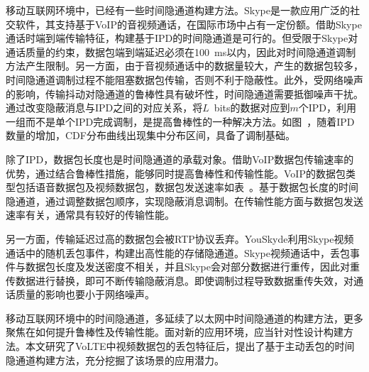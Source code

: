 移动互联网环境中，已经有一些时间隐通道构建方法。Skype是一款应用广泛的社交软件，其支持基于VoIP的音视频通话，在国际市场中占有一定份额。借助Skype通话时端到端传输特征，构建基于IPD的时间隐通道是可行的。但受限于Skype对通话质量的约束，数据包端到端延迟必须在{100\ ms}以内，因此对时间隐通道调制方法产生限制。另一方面，由于音视频通话中的数据量较大，产生的数据包较多，时间隐通道调制过程不能阻塞数据包传输，否则不利于隐蔽性。此外，受网络噪声的影响，传输抖动对隐通道的鲁棒性具有破坏性，时间隐通道需要抵御噪声干扰。通过改变隐蔽消息与IPD之间的对应关系，将{$L$\ bits}的数据对应到$m$个IPD，利用一组而不是单个IPD完成调制，是提高鲁棒性的一种解决方法。如图\ ，随着IPD数量的增加，CDF分布曲线出现集中分布区间，具备了调制基础。


除了IPD，数据包长度也是时间隐通道的承载对象。借助VoIP数据包传输速率的优势，通过结合鲁棒性措施，能够同时提高鲁棒性和传输性能。VoIP的数据包类型包括语音数据包及视频数据包，数据包发送速率如表\ 。基于数据包长度的时间隐通道，通过调整数据包顺序，实现隐蔽消息调制。在传输性能方面与数据包发送速率有关，通常具有较好的传输性能。

另一方面，传输延迟过高的数据包会被RTP协议丢弃。YouSkyde利用Skype视频通话中的随机丢包事件，构建出高性能的存储隐通道。Skype视频通话中，丢包事件与数据包长度及发送密度不相关，并且Skype会对部分数据进行重传，因此对重传数据进行替换，即可不断传输隐蔽消息。即使调制过程导致数据重传失效，对通话质量的影响也要小于网络噪声。

移动互联网环境中的时间隐通道，多延续了以太网中时间隐通道的构建方法，更多聚焦在如何提升鲁棒性及传输性能。面对新的应用环境，应当针对性设计构建方法。本文研究了VoLTE中视频数据包的丢包特征后，提出了基于主动丢包的时间隐通道构建方法，充分挖掘了该场景的应用潜力。

